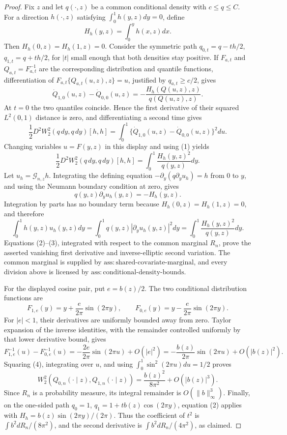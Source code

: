 \documentclass{article}
\begin{document}
\begin{proof}
Fix \(z\) and let \(q(\cdot,z)\) be a common conditional density with \(c\le q\le C\).  For a direction \(h(\cdot,z)\) satisfying \(\int_0^1h(y,z)dy=0\), define
\[
H_h(y,z)=\int_0^y h(x,z)dx .
\]
Then \(H_h(0,z)=H_h(1,z)=0\).  Consider the symmetric path \(q_{0,t}=q-th/2\), \(q_{1,t}=q+th/2\), for \(|t|\) small enough that both densities stay positive.  If \(F_{a,t}\) and \(Q_{a,t}=F_{a,t}^{-1}\) are the corresponding distribution and quantile functions, differentiation of \(F_{a,t}\{Q_{a,t}(u,z),z\}=u\), justified by \(q_{a,t}\ge c/2\), gives
\[
\dot Q_{1,0}(u,z)-\dot Q_{0,0}(u,z)
=-\frac{H_h(Q(u,z),z)}{q(Q(u,z),z)}.                                      \tag{1}
\]
At \(t=0\) the two quantiles coincide.  Hence the first derivative of their squared \(L^2(0,1)\) distance is zero, and differentiating a second time gives
\[
\frac12D^2W_2^2(q\,dy,q\,dy)[h,h]
=\int_0^1\{\dot Q_{1,0}(u,z)-\dot Q_{0,0}(u,z)\}^2du.
\]
Changing variables \(u=F(y,z)\) in this display and using (1) yields
\[
\frac12D^2W_2^2(q\,dy,q\,dy)[h,h]
=\int_0^1\frac{H_h(y,z)^2}{q(y,z)}dy.                                      \tag{2}
\]
Let \(u_h=\mathcal G_{n,z}h\).  Integrating the defining equation
\(-\partial_y(q\partial_yu_h)=h\) from \(0\) to \(y\), and using the Neumann boundary condition at zero, gives
\[
q(y,z)\partial_yu_h(y,z)=-H_h(y,z).
\]
Integration by parts has no boundary term because \(H_h(0,z)=H_h(1,z)=0\), and therefore
\[
\int_0^1h(y,z)u_h(y,z)dy
=\int_0^1q(y,z)|\partial_yu_h(y,z)|^2dy
=\int_0^1\frac{H_h(y,z)^2}{q(y,z)}dy.                                      \tag{3}
\]
Equations (2)--(3), integrated with respect to the common marginal \(R_n\), prove the asserted vanishing first derivative and inverse-elliptic second variation.  The common marginal is supplied by \(\mathrm{ass{:}shared\text{-}covariate\text{-}marginal}\), and every division above is licensed by \(\mathrm{ass{:}conditional\text{-}density\text{-}bounds}\).

For the displayed cosine pair, put \(e=b(z)/2\).  The two conditional distribution functions are
\[
F_{1,e}(y)=y+\frac{e}{2\pi}\sin(2\pi y),\qquad
F_{0,e}(y)=y-\frac{e}{2\pi}\sin(2\pi y).
\]
For \(|e|<1\), their derivatives are uniformly bounded away from zero.  Taylor expansion of the inverse identities, with the remainder controlled uniformly by that lower derivative bound, gives
\[
F_{1,e}^{-1}(u)-F_{0,e}^{-1}(u)
=-\frac{2e}{2\pi}\sin(2\pi u)+O(|e|^2)
=-\frac{b(z)}{2\pi}\sin(2\pi u)+O(|b(z)|^2).                              \tag{4}
\]
Squaring (4), integrating over \(u\), and using \(\int_0^1\sin^2(2\pi u)du=1/2\) proves
\[
W_2^2(Q_{0,n}(\cdot\mid z),Q_{1,n}(\cdot\mid z))
=\frac{b(z)^2}{8\pi^2}+O(|b(z)|^3).                                        \tag{5}
\]
Since \(R_n\) is a probability measure, its integral remainder is \(O(\|b\|_\infty^3)\).  Finally, on the one-sided path \(q_0=1\), \(q_1=1+t b(z)\cos(2\pi y)\), equation (2) applies with \(H_h=b(z)\sin(2\pi y)/(2\pi)\).  Thus the coefficient of \(t^2\) is \(\int b^2dR_n/(8\pi^2)\), and the second derivative is \(\int b^2dR_n/(4\pi^2)\), as claimed.
\end{proof}
\end{document}
